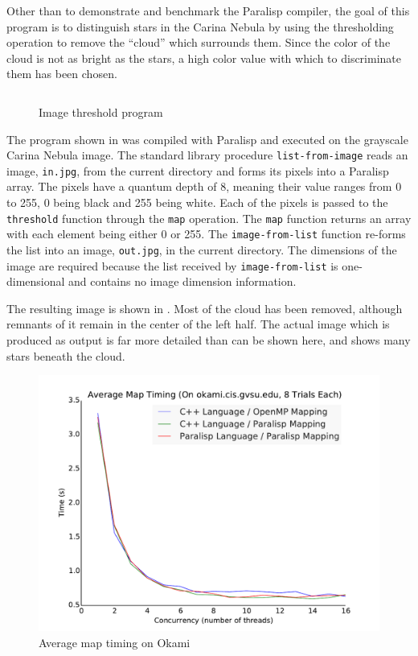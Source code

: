 \documentclass[
abstracton,
fontsize=12pt,
]{scrartcl}
\begin{document}
Other than to demonstrate and benchmark the Paralisp compiler, the goal of this program is to distinguish stars in the Carina Nebula by using the thresholding operation to remove the ``cloud'' which surrounds them. Since the color of the cloud is not as bright as the stars, a high color value with which to discriminate them has been chosen.

\begin{figure}
  \centering
  \inputminted{scheme}{code/image-threshold.scm}
  \caption{Image threshold program}\label{fig:image-threshold-program}
\end{figure}

The program shown in  was compiled with Paralisp and executed on the grayscale Carina Nebula image. The standard library procedure \verb|list-from-image| reads an image, \texttt{in.jpg}, from the current directory and forms its pixels into a Paralisp array. The pixels have a quantum depth of 8, meaning their value ranges from 0 to 255, 0 being black and 255 being white. Each of the pixels is passed to the \verb|threshold| function through the \verb|map| operation. The \verb|map| function returns an array with each element being either 0 or 255. The \verb|image-from-list| function re-forms the list into an image, \texttt{out.jpg}, in the current directory. The dimensions of the image are required because the list received by \verb|image-from-list| is one-dimensional and contains no image dimension information.

The resulting image is shown in . Most of the cloud has been removed, although remnants of it remain in the center of the left half. The actual image which is produced as output is far more detailed than can be shown here, and shows many stars beneath the cloud.

\begin{figure}
  \centering
  \includegraphics[width=\textwidth]{images/timing-okami}
  \caption{Average map timing on Okami}\label{fig:timing-okami}
\end{figure}
\end{document}
